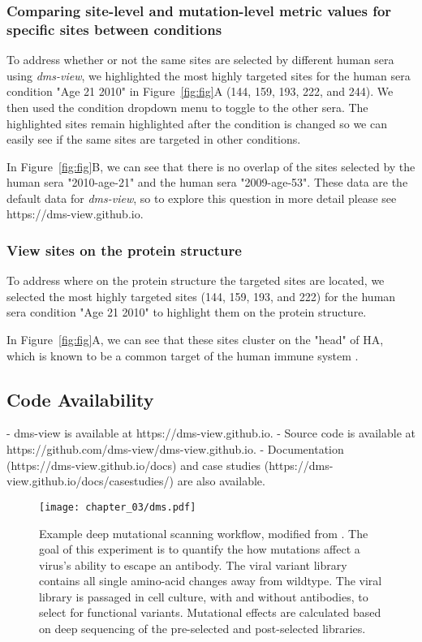 \subsubsection{Comparing site-level and mutation-level metric values for specific sites between conditions}

To address whether or not the same sites are selected by different human sera using \emph{dms-view}, we highlighted the most highly targeted sites for the human sera condition "Age 21 2010" in Figure~\ref{fig:fig}A (144, 159, 193, 222, and 244).
We then used the condition dropdown menu to toggle to the other sera.
The highlighted sites remain highlighted after the condition is changed so we can easily see if the same sites are targeted in other conditions.

In Figure~\ref{fig:fig}B, we can see that there is no overlap of the sites selected by the human sera "2010-age-21" and the human sera "2009-age-53".
These data are the default data for \emph{dms-view}, so to explore this question in more detail please see https://dms-view.github.io.

\subsubsection{View sites on the protein structure}

To address where on the protein structure the targeted sites are located, we selected the most highly targeted sites (144, 159, 193, and 222) for the human sera condition "Age 21 2010" to highlight them on the protein structure.

In Figure~\ref{fig:fig}A, we can see that these sites cluster on the "head" of HA, which is known to be a common target of the human immune system \citep{chambers2015identification}.

\subsection{Code Availability}

- dms-view is available at https://dms-view.github.io.
- Source code is available at https://github.com/dms-view/dms-view.github.io.
- Documentation (https://dms-view.github.io/docs) and case studies (https://dms-view.github.io/docs/casestudies/) are also available.

\begin{figure}[ht]
  \centering
  \texttt{[image: chapter\_03/dms.pdf]}
  \caption{Example deep mutational scanning workflow, modified from \citet{lee2019mapping}. The goal of this experiment is to quantify the how mutations affect a virus's ability to escape an antibody. The viral variant library contains all single amino-acid changes away from wildtype. The viral library is passaged in cell culture, with and without antibodies, to select for functional variants. Mutational effects are calculated based on deep sequencing of the pre-selected and post-selected libraries.\label{fig:dms}}
\end{figure}

